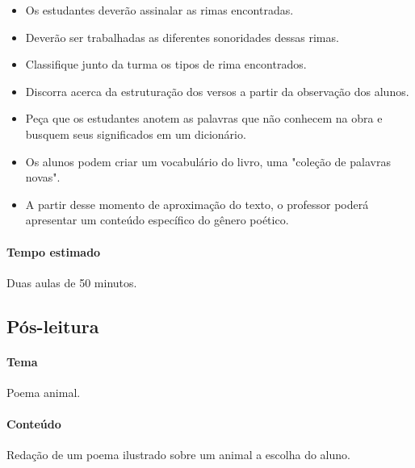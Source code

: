 \documentclass[11pt]{extarticle}
\begin{document}
\begin{itemize}

\item Os estudantes deverão assinalar as rimas encontradas.

\item Deverão ser trabalhadas as diferentes sonoridades dessas rimas.

\item Classifique junto da turma os tipos de rima encontrados.

\item Discorra acerca da estruturação dos versos a partir da observação dos alunos.

\item Peça que os estudantes anotem as palavras que não conhecem na obra e busquem seus significados em um dicionário. 

\item Os alunos podem criar um vocabulário do livro, uma "coleção de palavras novas". 

\item A partir desse momento de aproximação do texto, o professor poderá apresentar um conteúdo específico do gênero poético. 

\end{itemize}

\paragraph{Tempo estimado} Duas aulas de 50 minutos.


\subsection{Pós-leitura}


\paragraph{Tema} Poema animal.

\paragraph{Conteúdo} Redação de um poema ilustrado sobre um animal a escolha do aluno.
\end{document}
